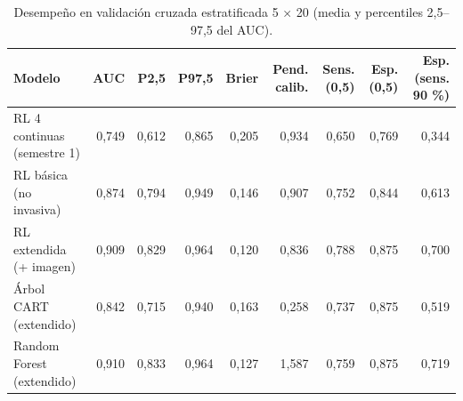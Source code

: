 \begin{table}[H]
\caption{Desempeño en validación cruzada estratificada 5 × 20 (media y percentiles 2,5–97,5 del AUC).}
\label{tab:desempeno}
\begin{tabular}{lrrrrrrrr}
\toprule
Modelo & AUC & P2,5 & P97,5 & Brier & Pend. calib. & Sens. (0,5) & Esp. (0,5) & Esp. (sens. 90 \%) \\
\midrule
RL 4 continuas (semestre 1) & 0,749 & 0,612 & 0,865 & 0,205 & 0,934 & 0,650 & 0,769 & 0,344 \\
RL básica (no invasiva) & 0,874 & 0,794 & 0,949 & 0,146 & 0,907 & 0,752 & 0,844 & 0,613 \\
RL extendida (+ imagen) & 0,909 & 0,829 & 0,964 & 0,120 & 0,836 & 0,788 & 0,875 & 0,700 \\
Árbol CART (extendido) & 0,842 & 0,715 & 0,940 & 0,163 & 0,258 & 0,737 & 0,875 & 0,519 \\
Random Forest (extendido) & 0,910 & 0,833 & 0,964 & 0,127 & 1,587 & 0,759 & 0,875 & 0,719 \\
\bottomrule
\end{tabular}
\end{table}
